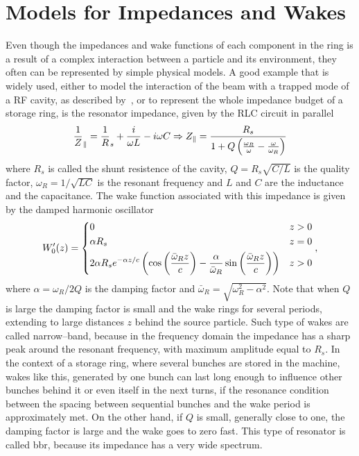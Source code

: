 \section{Models for Impedances and Wakes}

    Even though the impedances and wake functions of each component in the ring is a result of a complex interaction between a particle and its environment, they often can be represented by simple physical models. A good example that is widely used, either to model the interaction of the beam with a trapped mode of a RF cavity, as described by~, or to represent the whole impedance budget of a storage ring, is the resonator impedance, given by the RLC circuit in parallel
    \begin{align}
        \frac1Z_\parallel =  \frac1R_s + \frac{i}{\omega L} - i\omega C \Rightarrow
        Z_\parallel = \frac{R_s}{1 + Q\left(\frac{\omega_R}{\omega}-\frac{\omega}{\omega_R}\right)}
    \end{align}
    where $R_s$ is called the shunt resistence of the cavity, $Q = R_s\sqrt{C/L}$ is the quality factor, $\omega_R = 1/\sqrt{LC}$ is the resonant frequency and  $L$ and $C$ are the inductance and the capacitance. The wake function associated with this impedance is given by the damped harmonic oscillator
    \begin{align}
        W'_0(z) =
        \begin{dcases}
            0 & z > 0 \\
            \alpha R_s & z = 0 \\
            2\alpha R_se^{-\alpha z/c}\left(\cos\left(\frac{\bar{\omega}_Rz}{c}\right)-
                                    \frac{\alpha}{\bar{\omega}_R}
                                        \sin\left(\frac{\bar{\omega}_Rz}{c}\right)\right) & z>0
        \end{dcases},
    \end{align}
    where $\alpha = \omega_R/2Q$ is the damping factor and $\bar{\omega}_R=\sqrt{\omega_R^2-\alpha^2}$. Note that when $Q$ is large the damping factor is small and the wake rings for several periods, extending to large distances $z$ behind the source particle. Such type of wakes are called narrow--band, because in the frequency domain the impedance has a sharp peak around the resonant frequency, with maximum amplitude equal to $R_s$. In the context of a storage ring, where several bunches are stored in the machine, wakes like this, generated by one bunch can last long enough to influence other bunches behind it or even itself in the next turns, if the resonance condition between the spacing between sequential bunches and the wake period is approximately met. On the other hand, if $Q$ is small, generally close to one, the damping factor is large and the wake goes to zero fast. This type of resonator is called \gls{bbr}, because its impedance has a very wide spectrum.

